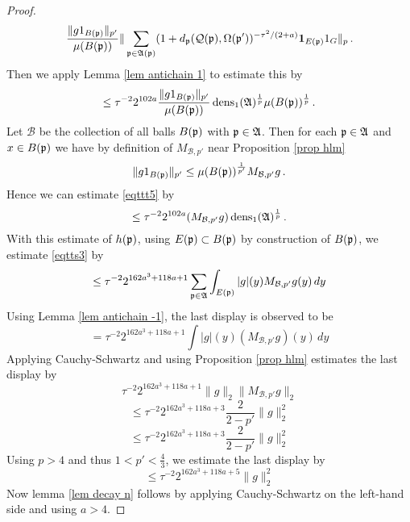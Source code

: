 \begin{proof}
   \begin{equation}
\frac{\|g1_{B(\mathfrak p)}\|_{p'}}{\mu(B(\mathfrak p))}
 \|\sum_{\mathfrak p\in\mathfrak{A}(\mathfrak p)}(1+d_{\mathfrak p}(\mathcal{Q}(\mathfrak p), \Omega(\mathfrak p'))^{-\tau^2/(2+a)}\mathbf{1}_{E(\mathfrak p)}1_G\|_{p}\, .
 \end{equation}
Then we apply Lemma \ref{lem antichain 1} to estimate this by
\begin{equation}\label{eqttt5}
    \le  \tau^{-2}
2^{102a}
    \frac{\|g1_{B(\mathfrak p)}\|_{p'}}{\mu(B(\mathfrak p))}
   \operatorname{\operatorname{dens}}_1(\mathfrak{A})^{\frac 1p}\mu(B(\mathfrak p))^{\frac 1p}\, .
\end{equation}
Let $\mathcal{B}$ be the collection of all balls
$B(\mathfrak p)$ with $\mathfrak p\in \mathfrak{A}$. Then
for each $\mathfrak p\in \mathfrak{A}$ and $x\in B(\mathfrak p)$ we have by
definition of $M_{\mathcal{B},p'}$
near Proposition \ref{prop hlm}
\begin{equation}
\|g1_{B(\mathfrak p)}\|_{p'}\le
\mu(B(\mathfrak p))^{\frac 1{p'}} M_{\mathcal{B},p'}g \, .
\end{equation}
Hence we can estimate \eqref{eqttt5} by
\begin{equation}\label{eqttt5}
    \le  \tau^{-2}
2^{102a}
    (M_{\mathcal{B}, p'}g)
   \operatorname{\operatorname{dens}}_1(\mathfrak{A})^{\frac 1p}\, .
\end{equation}
With this estimate of $h(\mathfrak p)$,
using $E(\mathfrak p)\subset B(\mathfrak p)$ by construction of $B(\mathfrak p)$, we estimate
\eqref{eqtts3} by
 \begin{equation}\label{eqtts4}
 \le  \tau^{-2}2^{162a^3+118a + 1} \sum_{\mathfrak p\in \mathfrak{A}}
 \int_{E(\mathfrak p)}|g|(y)M_{\mathcal{B}, p'}g(y) \, dy
         \end{equation}
Using Lemma \ref{lem antichain -1},
the last display is observed to be
\begin{equation}\label{eqtts4}
=  \tau^{-2}2^{162a^3+118a + 1}
 \int |g|(y)(M_{\mathcal{B}, p'}g)(y) \, dy
         \end{equation}
Applying Cauchy-Schwartz and using Proposition \eqref{prop hlm} estimates the last display by
\begin{equation}
  \tau^{-2}2^{162a^3+118a + 1}
 \|g\|_2 \|M_{\mathcal{B}, p'} g\|_2
         \end{equation}
\begin{equation}
 \le  \tau^{-2}2^{162a^3+118a + 3}\frac{2}{2-p'}
 \|g\|_2 ^2
          \end{equation}
\begin{equation}\le  \tau^{-2}2^{162a^3+118a + 3}\frac{2}{2-p'}
\|g\|_2^2
         \end{equation}
Using $p>4$ and thus $1<p'<\frac 43$, we estimate the last display by
\begin{equation}\le  \tau^{-2}2^{162a^3+118a + 5}
\|g\|_2^2
         \end{equation}
Now lemma \ref{lem decay n} follows by applying Cauchy-Schwartz on the left-hand side and using
 $a>4$.




\end{proof}


